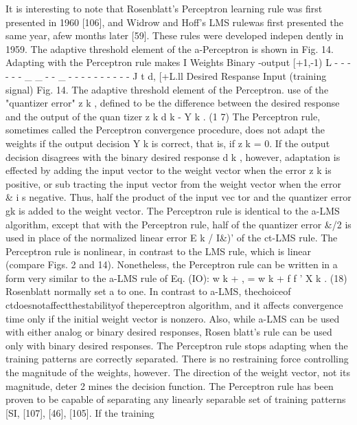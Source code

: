 \documentclass[11pt,a4paper,twocolumn]{article}
\begin{document}
\newpage


It is interesting to note that Rosenblatt's Perceptron 
learning rule was first presented in 1960 [106], and Widrow 
and Hoff's LMS rulewas first presented the same year, afew 
months later [59]. These rules were developed indepen
dently in 1959. 
The adaptive threshold element of the a-Perceptron is 
shown in Fig. 14. Adapting with the Perceptron rule makes 
I 
Weights 
Binary 
-output 
[+1,-1) 
L - - - - - - \_ \_ - - \_ - - - - - - - - - -  
J t d, [+L.ll 
Desired Respanse Input 
(training signal) 
Fig. 14. The adaptive threshold element of the Perceptron. 
use of the "quantizer error" z k ,  defined to be the difference 
between the desired response and the output of the quan
tizer 
z k  
d k  - Y k .  
(1 7) 
The Perceptron rule, sometimes called the Perceptron 
convergence procedure, does not adapt the weights if the 
output decision Y k  is correct, that is, if z k  = 0. If the output 
decision disagrees with the binary desired response d k ,  
however, adaptation is effected by adding the input vector 
to the weight vector when the error z k  is positive, or sub
tracting the input vector from the weight vector when the 
error \& i s  negative. Thus, half the product of the input vec
tor and the quantizer error gk is added to the weight vector. 
The Perceptron rule is identical to the a-LMS algorithm, 
except that with the Perceptron rule, half of the quantizer 
error \&/2 is used in place of the normalized linear error E k /  
I\&)' 
of the ct-LMS rule. The Perceptron rule is nonlinear, 
in contrast to the LMS rule, which is linear (compare Figs. 
2 and 14). Nonetheless, the Perceptron rule can be written 
in a form very similar to the a-LMS rule of Eq. (IO): 
w k + ,  = w
k
 + f f  ' X k .  
(18) 
Rosenblatt normally set a to one. In contrast to a-LMS, 
thechoiceof ctdoesnotaffectthestabilityof theperceptron 
algorithm, and it affects convergence time only if the initial 
weight vector is nonzero. Also, while a-LMS can be used 
with either analog or binary desired responses, Rosen
blatt's rule can be used only with binary desired responses. 
The Perceptron rule stops adapting when the training 
patterns are correctly separated. There is no restraining 
force controlling the magnitude of the weights, however. 
The direction of the weight vector, not its magnitude, deter
2 
mines the decision function. The Perceptron rule has been 
proven to be capable of separating any linearly separable 
set of training patterns [SI, [107], [46], [105]. If the training 
\end{document}
